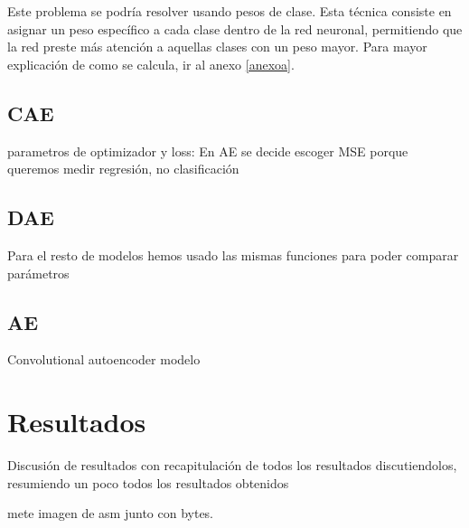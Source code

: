 Este problema se podría resolver usando pesos de clase. Esta técnica consiste en asignar un peso específico a cada clase dentro de la red neuronal, permitiendo que la red preste más atención a aquellas clases con un peso mayor. Para mayor explicación de como se calcula, ir al anexo \ref{anexoa}.




 

\subsection{CAE}
parametros de optimizador y loss: \citep{guo2017deep}
En AE se decide escoger MSE porque queremos medir regresión, no clasificación
\subsection{DAE}
Para el resto de modelos hemos usado las mismas funciones para poder comparar parámetros
\subsection{AE}
Convolutional autoencoder modelo \citep{xing2022malware}




\section{Resultados}

Discusión de resultados con recapitulación de todos los resultados discutiendolos, resumiendo un poco todos los resultados obtenidos













\citep{gibert2022fusing} mete imagen de asm junto con bytes.




